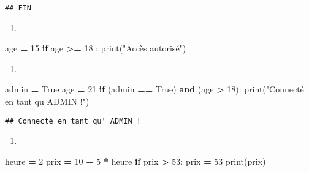 \documentclass[
]{book}
\newenvironment{Shaded}{\begin{snugshade}}{\end{snugshade}}
\newcommand{\BuiltInTok}[1]{#1}
\newcommand{\ControlFlowTok}[1]{\textcolor[rgb]{0.13,0.29,0.53}{\textbf{#1}}}
\newcommand{\DecValTok}[1]{\textcolor[rgb]{0.00,0.00,0.81}{#1}}
\newcommand{\KeywordTok}[1]{\textcolor[rgb]{0.13,0.29,0.53}{\textbf{#1}}}
\newcommand{\NormalTok}[1]{#1}
\newcommand{\OperatorTok}[1]{\textcolor[rgb]{0.81,0.36,0.00}{\textbf{#1}}}
\newcommand{\StringTok}[1]{\textcolor[rgb]{0.31,0.60,0.02}{#1}}
\newcommand{\VariableTok}[1]{\textcolor[rgb]{0.00,0.00,0.00}{#1}}
\providecommand{\tightlist}{%
  \setlength{\itemsep}{0pt}\setlength{\parskip}{0pt}}
\def\tightlist{}
\begin{document}
\begin{verbatim}
## FIN
\end{verbatim}

\begin{enumerate}
\def\labelenumi{\arabic{enumi}.}
\setcounter{enumi}{2}
\tightlist
\item
\end{enumerate}

\begin{Shaded}
\begin{Highlighting}[]
\NormalTok{age }\OperatorTok{=} \DecValTok{15}
\ControlFlowTok{if}\NormalTok{ age }\OperatorTok{\textgreater{}=} \DecValTok{18}\NormalTok{ :}
  \BuiltInTok{print}\NormalTok{(}\StringTok{"Accès autorisé"}\NormalTok{)}
\end{Highlighting}
\end{Shaded}

\begin{enumerate}
\def\labelenumi{\arabic{enumi}.}
\setcounter{enumi}{3}
\tightlist
\item
\end{enumerate}

\begin{Shaded}
\begin{Highlighting}[]
\NormalTok{admin }\OperatorTok{=} \VariableTok{True}
\NormalTok{age }\OperatorTok{=} \DecValTok{21}
\ControlFlowTok{if}\NormalTok{ (admin }\OperatorTok{==} \VariableTok{True}\NormalTok{) }\KeywordTok{and}\NormalTok{ (age }\OperatorTok{\textgreater{}} \DecValTok{18}\NormalTok{):}
  \BuiltInTok{print}\NormalTok{(}\StringTok{"Connecté en tant qu\textquotesingle{} ADMIN !"}\NormalTok{)}
\end{Highlighting}
\end{Shaded}

\begin{verbatim}
## Connecté en tant qu' ADMIN !
\end{verbatim}

\begin{enumerate}
\def\labelenumi{\arabic{enumi}.}
\setcounter{enumi}{4}
\tightlist
\item
\end{enumerate}

\begin{Shaded}
\begin{Highlighting}[]
\NormalTok{heure }\OperatorTok{=} \DecValTok{2}
\NormalTok{prix }\OperatorTok{=} \DecValTok{10} \OperatorTok{+} \DecValTok{5} \OperatorTok{*}\NormalTok{ heure}
\ControlFlowTok{if}\NormalTok{ prix }\OperatorTok{\textgreater{}} \DecValTok{53}\NormalTok{:}
\NormalTok{   prix }\OperatorTok{=} \DecValTok{53}
\BuiltInTok{print}\NormalTok{(prix)}
\end{Highlighting}
\end{Shaded}
\end{document}

